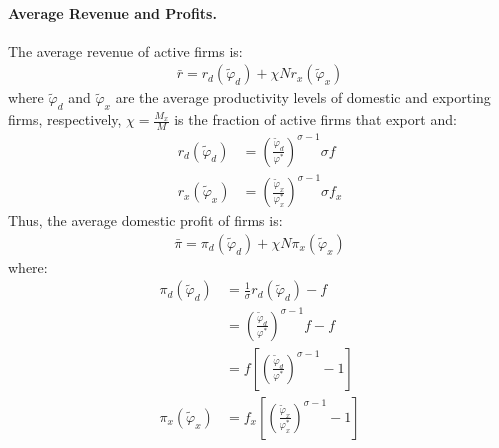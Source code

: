 \begin{solution}
	\paragraph{Average Revenue and Profits.} The average revenue of active firms is:
	\begin{align*}
		\bar{r} = r_d(\tilde{\varphi}_d) + \chi N r_x(\tilde{\varphi}_x)
	\end{align*}
	where $\tilde{\varphi}_d$ and $\tilde{\varphi}_x$ are the average productivity levels of domestic and exporting firms, respectively,  $\chi = \frac{M_x}{M}$ is the fraction of active firms that export and:
	\begin{align*}
		r_d(\tilde{\varphi}_d) &= \left(\frac{\tilde{\varphi}_d}{\varphi^*}\right)^{\sigma - 1} \sigma f \\
		r_x(\tilde{\varphi}_x) &= \left(\frac{\tilde{\varphi}_x}{\varphi_x^*}\right)^{\sigma - 1} \sigma f_x
	\end{align*}
	Thus, the average domestic profit of firms is:
	\begin{align*}
		\bar{\pi} = \pi_d(\tilde{\varphi}_d) + \chi N \pi_x(\tilde{\varphi}_x)
	\end{align*}
	where:
	\begin{align*}
		\pi_d(\tilde{\varphi}_d) &= \frac{1}{\sigma} r_d(\tilde{\varphi}_d) - f \\
		&= \left(\frac{\tilde{\varphi}_d}{\varphi^*}\right)^{\sigma - 1} f - f \\
		&= f \left[ \left(\frac{\tilde{\varphi}_d}{\varphi^*}\right)^{\sigma - 1} - 1 \right] \\
		\pi_x(\tilde{\varphi}_x) &= f_x \left[ \left(\frac{\tilde{\varphi}_x}{\varphi_x^*}\right)^{\sigma - 1} - 1 \right]
	\end{align*}


\end{solution}
